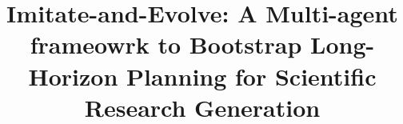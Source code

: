 \documentclass[manuscript,review,anonymous]{acmart}
\begin{document}
\title{Imitate-and-Evolve: A Multi-agent frameowrk to Bootstrap Long-Horizon Planning for Scientific Research Generation}









\end{document}
